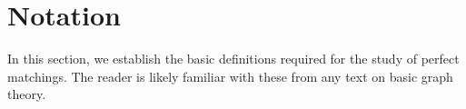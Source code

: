 \section{Notation}

In this section, we establish the basic definitions required for the study of perfect matchings. The reader is likely familiar with these from any text on basic graph theory.